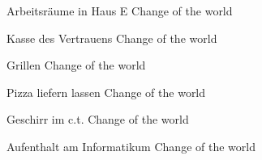 \documentclass[avery5371,fronts,frame]{flashcards} %
\begin{document}
\begin{flashcard}{Arbeitsräume in Haus E}
	Change of the world
\end{flashcard}
\begin{flashcard}{Kasse des Vertrauens}
	Change of the world
\end{flashcard}
\begin{flashcard}{Grillen}
	Change of the world
\end{flashcard}
\begin{flashcard}{Pizza liefern lassen}
	Change of the world
\end{flashcard}
\begin{flashcard}{Geschirr im c.t.}
	Change of the world
\end{flashcard}
\begin{flashcard}{Aufenthalt am Informatikum}
	Change of the world
\end{flashcard}
\end{document}
